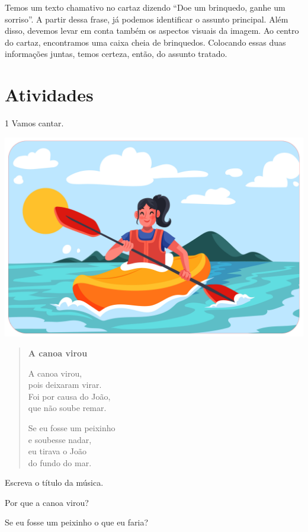 {Temos um texto chamativo no cartaz dizendo ``Doe um brinquedo, ganhe um sorriso''. A partir dessa frase, já podemos identificar o assunto principal. Além disso, devemos levar em conta também os aspectos visuais da imagem. Ao centro do cartaz, encontramos uma caixa cheia de brinquedos. Colocando essas duas informações juntas, temos certeza, então, do assunto tratado.
}

\section*{Atividades}

\num{1} Vamos cantar.


\begin{myquote}
\begin{center}
\noindent\includegraphics[width=.6\textwidth]{media/image183.png}\bigskip
\end{center}
\begin{verse}
\textbf{A canoa virou}

A canoa virou,\\
pois deixaram virar.\\
Foi por causa do João,\\
que não soube remar.

Se eu fosse um peixinho\\
e soubesse nadar,\\
eu tirava o João\\
do fundo do mar.
\end{verse}

\end{myquote}

\begin{escolha}
\item Escreva o título da música.


\item Por que a canoa virou?


\item Se eu fosse um peixinho o que eu faria?

\end{escolha}

